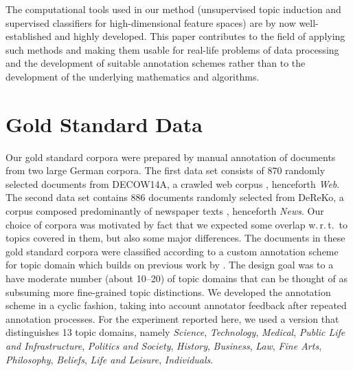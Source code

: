 \documentclass[11pt]{article}
\begin{document}
The computational tools used in our method (unsupervised topic induction and supervised classifiers for high-dimensional feature spaces) are by now well-established and highly developed.
This paper contributes to the field of applying such methods and making them usable for real-life problems of data processing and the development of suitable annotation schemes rather than to the development of the underlying mathematics and algorithms.

\section{Gold Standard Data}
\label{sec:goldstandard}

Our gold standard corpora were prepared by manual annotation of documents from two large German corpora.
The first data set consists of 870 randomly selected documents from DECOW14A, a crawled web corpus \cite{SchaeferBildhauer2012a,Schaefer2015b}, henceforth \textit{Web}.
The second data set contains 886 documents randomly selected from DeReKo, a corpus composed predominantly of newspaper texts \cite{KupietzEa2010}, henceforth \textit{News}. 
Our choice of corpora was motivated by fact that we expected some overlap w.\,r.\,t.\ to topics covered in them, but also some major differences. 
The documents in these gold standard corpora were classified according to a custom annotation scheme for topic domain which builds on previous work by .
The design goal was to a have moderate number (about 10--20) of topic domains that can be thought of as subsuming more fine-grained topic distinctions.
We developed the annotation scheme in a cyclic fashion, taking into account annotator feedback after repeated annotation processes.
For the experiment reported here, we used a version that distinguishes 13 topic domains, namely \textit{Science}, \textit{Technology}, \textit{Medical}, \textit{Public Life and Infrastructure}, \textit{Politics and Society}, \textit{History}, \textit{Business}, \textit{Law}, \textit{Fine Arts},  \textit{Philosophy}, \textit{Beliefs},  \textit{Life and Leisure}, \textit{Individuals}.
\end{document}
